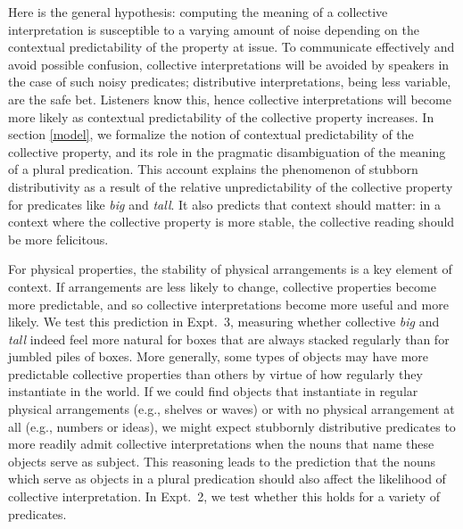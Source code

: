 \documentclass[preprint,12pt,authoryear,titlepage]{elsarticle}
\newcommand{\ndg}[1]{\textcolor{Green}{[ndg: #1]}}
\begin{document}
Here is the general hypothesis: computing the meaning of a collective interpretation is susceptible to a varying amount of noise depending on the contextual predictability of the property at issue.
To communicate effectively and avoid possible confusion, collective interpretations will be avoided by speakers in the case of such noisy predicates; distributive interpretations, being less variable, are the safe bet. 
Listeners know this, hence collective interpretations will become more likely as contextual predictability of the collective property increases.
In section \ref{model}, we formalize the notion of contextual predictability of the collective property, and its role in the pragmatic disambiguation of the meaning of a plural predication.
This account explains the phenomenon of stubborn distributivity as a result of the relative unpredictability of the collective property for predicates like \emph{big} and \emph{tall}.
It also predicts that context should matter: in a context where the collective property is more stable, the collective reading should be more felicitous.

For physical properties, the stability of physical arrangements is a key element of context. If arrangements are less likely to change, collective properties become more predictable, and so collective interpretations become more useful and more likely. 
We test this prediction in Expt.~3, measuring whether collective \emph{big} and \emph{tall} indeed feel more natural for boxes that are always stacked regularly than for jumbled piles of boxes.
More generally, some types of objects may have more predictable collective properties than others by virtue of how regularly they instantiate in the world.  If we could find objects that instantiate in regular physical arrangements (e.g., shelves or waves) or with no physical arrangement at all (e.g., numbers or ideas), we might expect stubbornly distributive predicates to more readily admit collective interpretations when the nouns that name these objects serve as subject.
This reasoning leads to the prediction that the nouns which serve as objects in a plural predication should also affect the likelihood of collective interpretation. %
In Expt.~2, we test whether this holds for a variety of predicates.
\end{document}

